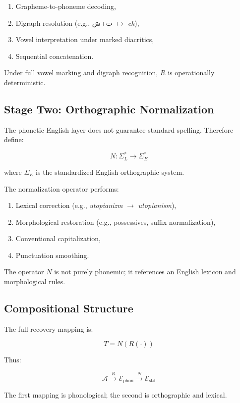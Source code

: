 \documentclass[12pt]{article}
\begin{document}
\begin{enumerate}
\item Grapheme-to-phoneme decoding,
\item Digraph resolution (e.g., ت+ش $\mapsto$ \textit{ch}),
\item Vowel interpretation under marked diacritics,
\item Sequential concatenation.
\end{enumerate}

Under full vowel marking and digraph recognition, $R$ is operationally deterministic.

\subsection{Stage Two: Orthographic Normalization}

The phonetic English layer does not guarantee standard spelling. Therefore define:

\[
N : \Sigma_{L}^\ast \rightarrow \Sigma_{E}^\ast
\]

where $\Sigma_{E}$ is the standardized English orthographic system.

The normalization operator performs:

\begin{enumerate}
\item Lexical correction (e.g., \textit{utopianizm} $\rightarrow$ \textit{utopianism}),
\item Morphological restoration (e.g., possessives, suffix normalization),
\item Conventional capitalization,
\item Punctuation smoothing.
\end{enumerate}

The operator $N$ is not purely phonemic; it references an English lexicon and morphological rules.

\subsection{Compositional Structure}

The full recovery mapping is:

\[
T = N(R(\cdot))
\]

Thus:

\[
\mathcal{A} \xrightarrow{R} \mathcal{E}_{\text{phon}} \xrightarrow{N} \mathcal{E}_{\text{std}}
\]

The first mapping is phonological; the second is orthographic and lexical.
\end{document}
